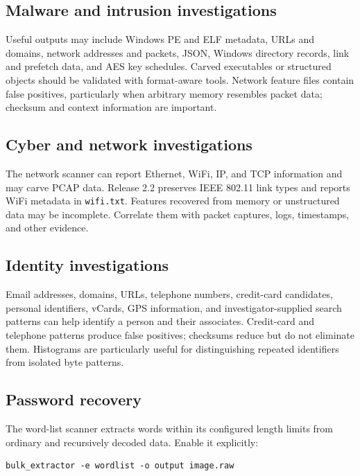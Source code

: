 \documentclass[11pt]{article}
\newcommand{\code}[1]{\texttt{#1}}
\begin{document}
\subsection{Malware and intrusion investigations}

Useful outputs may include Windows PE and ELF metadata, URLs and domains,
network addresses and packets, JSON, Windows directory records, link and
prefetch data, and AES key schedules. Carved executables or structured objects
should be validated with format-aware tools. Network feature files contain
false positives, particularly when arbitrary memory resembles packet data;
checksum and context information are important.

\subsection{Cyber and network investigations}

The network scanner can report Ethernet, WiFi, IP, and TCP information and may
carve PCAP data. Release 2.2 preserves IEEE 802.11 link types and reports WiFi
metadata in \code{wifi.txt}. Features recovered from memory or unstructured
data may be incomplete. Correlate them with packet captures, logs, timestamps,
and other evidence.

\subsection{Identity investigations}

Email addresses, domains, URLs, telephone numbers, credit-card candidates,
personal identifiers, vCards, GPS information, and investigator-supplied search
patterns can help identify a person and their associates. Credit-card and
telephone patterns produce false positives; checksums reduce but do not
eliminate them. Histograms are particularly useful for distinguishing repeated
identifiers from isolated byte patterns.

\subsection{Password recovery}

The word-list scanner extracts words within its configured length limits from
ordinary and recursively decoded data. Enable it explicitly:

\begin{Verbatim}
bulk_extractor -e wordlist -o output image.raw
\end{Verbatim}
\end{document}
